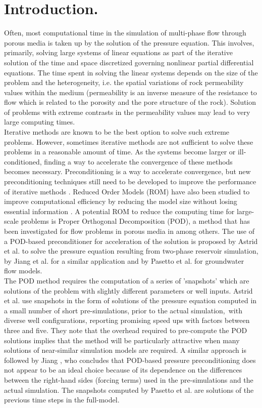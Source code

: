 \documentclass[12pt]{article}
\begin{document}
  \section{Introduction.}
  Often, most computational time in the simulation of multi-phase flow through porous media is taken 
  up by the solution of the pressure equation. 
This involves, primarily, solving large systems of linear equations as part of the iterative solution of the time and space discretized governing nonlinear partial differential 
equations. The time spent in solving the linear systems depends on the size of the problem and the heterogeneity, i.e. the spatial
variations of rock permeability values within the medium (permeability is an inverse measure of the resistance to flow which is related to the porosity and the pore structure of the rock). Solution of problems with extreme contrasts in the
permeability values may lead to very large computing times. \\
Iterative methods are known to be the best option to solve such extreme problems. However, sometimes iterative methods are not sufficient to solve these problems in a reasonable amount of time. As the systems become larger or ill-conditioned, finding a way to accelerate the convergence of these methods becomes necessary. Preconditioning is a way to accelerate convergence, but new preconditioning techniques still need to be developed to improve the performance of iterative methods \cite{Vuik02,Benzi02}.
Reduced Order Models (ROM) have also been studied to improve computational efficiency by reducing the model size without losing essential information \cite{Antoulas05,Schilders08,Quarteroni14}. 
A potential ROM to reduce the computing time for large-scale problems is Proper Orthogonal 
Decomposition (POD), a method that has been investigated for flow problems in porous media in \cite{Heijn04,Vermeulen04,Mark06,Doren06,Cardoso09,Astrid11,Krogstad11,Efendiev12,Jiang13,Pasetto16} among others. 
The use of a POD-based preconditioner for acceleration of the solution is proposed by Astrid et al.
\cite{Astrid11} to solve the pressure equation resulting from two-phase reservoir simulation, by Jiang et al. \cite{Jiang13} for a similar application and by Pasetto 
et al. \cite{Pasetto16} for groundwater flow models. \\
The POD method requires the computation of a series of 'snapshots' which are solutions of the problem with slightly 
different parameters or well inputs. Astrid et al. \cite{Astrid11} use snapshots in the form of solutions of the pressure equation computed in a small number of short pre-simulations, prior to the actual simulation,\ with diverse well configurations, reporting promising speed ups with factors between three and five. They note that the overhead required to pre-compute the POD solutions implies that the method will be particularly attractive when many solutions of near-similar simulation models are required. A similar approach is followed by Jiang \cite{Jiang13}, who concludes that POD-based pressure preconditioning does not appear to be an ideal choice because of its dependence on the differences between the right-hand sides (forcing terms) used in the pre-simulations and the actual simulation. The snapshots computed by Pasetto et al. \cite{Pasetto16} are solutions of the previous time steps in the full-model.
\end{document}
